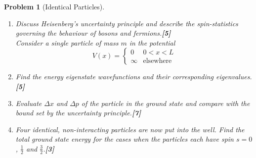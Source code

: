 \documentclass[a4paper]{article}
\theoremstyle{new}
\newtheorem{qns}{Problem}[subsection]
\begin{document}
\newpage
\begin{qns}[Identical Particles]\leavevmode
\begin{enumerate}[label=(\roman*)]
\item Discuss Heisenberg’s uncertainty principle and describe the spin-statistics governing the behaviour of bosons and fermions.\hfill\textbf{[5]}\\[5pt]
Consider a single particle of mass $m$ in the potential
$$V(x)=
\left\{
        \begin{array}{ll}
      0 & 0<x<L \\
      \infty & \text{elsewhere} 
        \end{array}
    \right.$$
\item Find the energy eigenstate wavefunctions and their corresponding eigenvalues.\hfill\textbf{[5]}
\item Evaluate $\Delta x$ and $\Delta p$ of the particle in the ground state and compare with the bound set by the uncertainty principle.\hfill\textbf{[7]}
\item Four identical, non-interacting particles are now put into the well. Find the total ground state energy for the cases when the particles each have spin $s = 0$, $\frac{1}{2}$ and $\frac{3}{2}$.\hfill\textbf{[3]}
\end{enumerate}
\end{qns}
\end{document}
